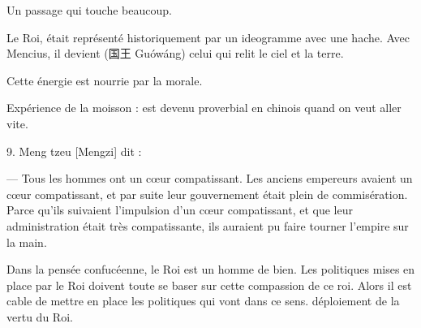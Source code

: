 \begin{singlequote}
    Un passage qui touche beaucoup. 
\end{singlequote}


Le Roi, était représenté historiquement par un ideogramme avec une hache. Avec Mencius, il devient (国王
Guówáng) celui qui relit le ciel et la terre. 



Cette énergie est nourrie par la morale. 

Expérience de la moisson : est devenu proverbial en chinois quand on veut aller vite.




\begin{singlequote}
  9.	Meng tzeu [Mengzi] dit :
  
—	Tous les hommes ont un cœur compatissant. Les anciens empereurs avaient un cœur compatissant, et par suite leur gouvernement était plein de commisération. Parce qu’ils suivaient l’impulsion d’un cœur compatissant, et que leur administration était très compatissante, ils auraient pu faire tourner l’empire sur la main.
\end{singlequote}

Dans la pensée confucéenne, le Roi est un homme de bien. Les politiques mises en place par le Roi doivent toute se baser sur cette compassion de ce roi. Alors il est cable de mettre en place les politiques qui vont dans ce sens. 
déploiement de la vertu du Roi. 


